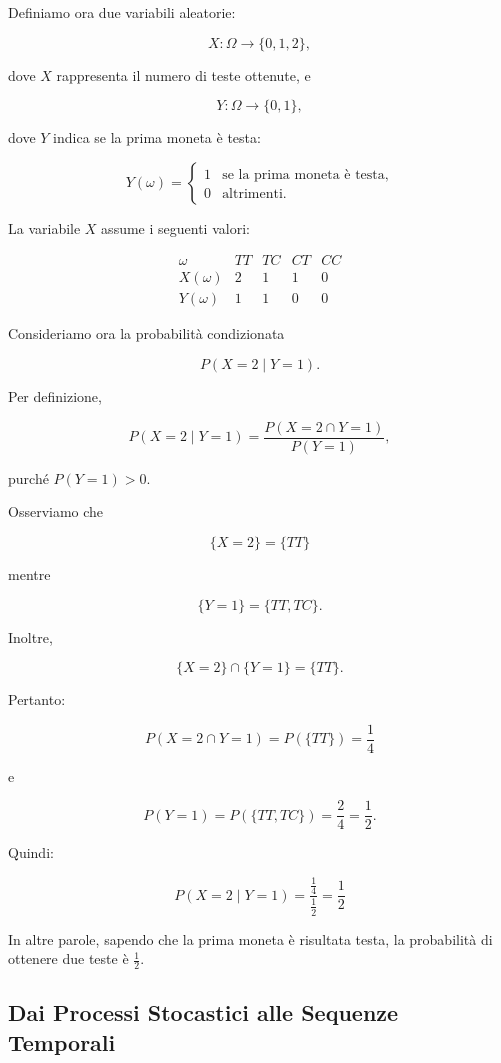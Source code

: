 Definiamo ora due variabili aleatorie:

\[
X:\Omega\to\{0,1,2\},
\]

dove $X$ rappresenta il numero di teste ottenute, e

\[
Y:\Omega\to\{0,1\},
\]

dove $Y$ indica se la prima moneta è testa:

\[
Y(\omega)=
\begin{cases}
1 & \text{se la prima moneta è testa},\\
0 & \text{altrimenti}.
\end{cases}
\]

La variabile $X$ assume i seguenti valori:

\[
\begin{array}{c|cccc}
\omega & TT & TC & CT & CC\\
\hline
X(\omega) & 2 & 1 & 1 & 0\\
Y(\omega) & 1 & 1 & 0 & 0
\end{array}
\]

Consideriamo ora la probabilità condizionata

\[
P(X=2\mid Y=1).
\]

Per definizione,

\[
P(X=2\mid Y=1)
=
\frac{P(X=2\cap Y=1)}
{P(Y=1)},
\]

purché $P(Y=1)>0$.

Osserviamo che

\[
\{X=2\}=\{TT\}
\]

mentre

\[
\{Y=1\}=\{TT,TC\}.
\]

Inoltre,

\[
\{X=2\}\cap\{Y=1\}
=
\{TT\}.
\]

Pertanto:

\[
P(X=2\cap Y=1)
=
P(\{TT\})
=
\frac14
\]

e

\[
P(Y=1)
=
P(\{TT,TC\})
=
\frac24
=
\frac12.
\]

Quindi:

\[
\boxed{
P(X=2\mid Y=1)
=
\frac{\frac14}{\frac12}
=
\frac12
}
\]

In altre parole, sapendo che la prima moneta è risultata testa, la probabilità di ottenere due teste è $\frac12$.


\subsection{Dai Processi Stocastici alle Sequenze Temporali}

